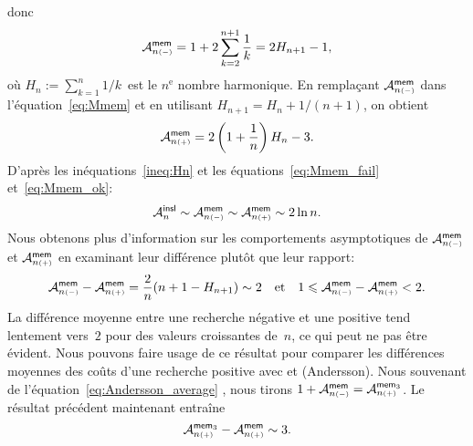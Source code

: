 donc
\begin{equation}
\abovedisplayskip=-6pt
\abovedisplayshortskip=-6pt
\M{\fun{mem}}{n{\scriptscriptstyle (-)}} =
1 + 2 \sum_{k=2}^{n+1}\frac{1}{k} = 2H_{n+1} - 1,
\index{mem@$\M{\fun{mem}}{n{\scriptscriptstyle (-)}}$}
\label{eq:Mmem_fail}
\end{equation}
où \(H_n := \sum_{k=1}^{n}1/k\)~est le \(n^\text{e}\) nombre
harmonique. En remplaçant
\(\M{\fun{mem}}{n{\scriptscriptstyle (-)}}\) dans
l'équation~\eqref{eq:Mmem} et en utilisant \(H_{n+1} = H_n +
1/(n+1)\), on obtient
\begin{equation}
\M{\fun{mem}}{n{\scriptscriptstyle (+)}} =
2\left(1+\frac{1}{n}\right)H_n - 3.
\index{mem@$\M{\fun{mem}}{n{\scriptscriptstyle (+)}}$}
\label{eq:Mmem_ok}
\end{equation}
D'après les inéquations~\eqref{ineq:Hn}  et
les équations~\eqref{eq:Mmem_fail} et~\eqref{eq:Mmem_ok}:
\begin{equation*}
\M{\fun{insl}}{n}
\sim \M{\fun{mem}}{n{\scriptscriptstyle (-)}}
\sim \M{\fun{mem}}{n{\scriptscriptstyle (+)}} \sim 2 \ln n.
\end{equation*}
Nous obtenons plus d'information sur les comportements asymptotiques
de \(\M{\fun{mem}}{n{\scriptscriptstyle(-)}}\) et
\(\M{\fun{mem}}{n{\scriptscriptstyle(+)}}\) en examinant leur
différence plutôt que leur rapport:
\begin{equation*}
\M{\fun{mem}}{n{\scriptscriptstyle (-)}} -
\M{\fun{mem}}{n{\scriptscriptstyle (+)}} =
\frac{2}{n}(n + 1 - H_{n+1}) \sim 2
\quad\text{et}\quad
1 \leqslant \M{\fun{mem}}{n{\scriptscriptstyle (-)}} -
\M{\fun{mem}}{n{\scriptscriptstyle (+)}} < 2.
\end{equation*}
La différence moyenne entre une recherche négative et une positive
tend lentement vers~\(2\) pour des valeurs croissantes de~\(n\), ce
qui peut ne pas être évident. Nous pouvons faire usage de ce résultat
pour comparer les différences moyennes des coûts d'une recherche
positive avec  et  (Andersson). Nous
souvenant de l'équation~\eqref{eq:Andersson_average}
, nous tirons \(1 +
\M{\fun{mem}}{n{\scriptscriptstyle (-)}} =
\M{\fun{mem}_3}{n{\scriptscriptstyle (+)}}\). Le résultat précédent
maintenant entraîne
\begin{equation*}
  \M{\fun{mem}_3}{n{\scriptscriptstyle (+)}} -
  \M{\fun{mem}}{n{\scriptscriptstyle (+)}} \sim 3.
\index{mem3@$\M{\fun{mem}_3}{n{\scriptscriptstyle (+)}}$}
\end{equation*}
